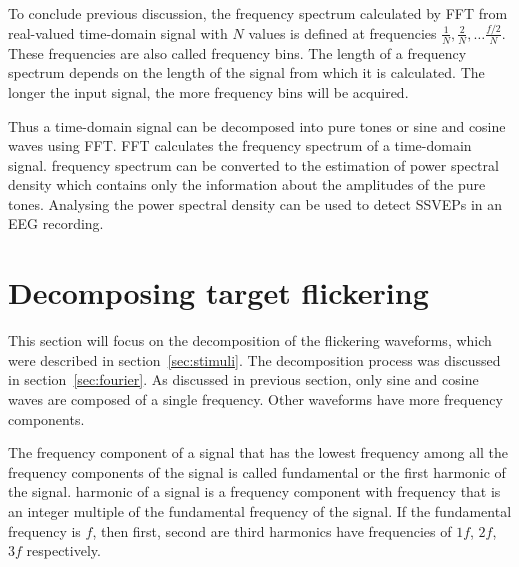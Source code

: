 To conclude previous discussion, the \gls{frequency spectrum} calculated by \gls{FFT} from real-valued time-domain signal with $N$ values is defined at frequencies $\frac{1}{N}, \frac{2}{N}, \dots\frac{f/2}{N}$. These frequencies are also called \glspl{frequency bin}. The length of a \gls{frequency spectrum} depends on the length of the signal from which it is calculated. The longer the input signal, the more \glspl{frequency bin} will be acquired.

Thus a time-domain signal can be decomposed into \glspl{pure tone} or sine and cosine waves using \gls{FFT}. \gls{FFT} calculates the \gls{frequency spectrum} of a time-domain signal. \Gls{frequency spectrum} can be converted to the estimation of \gls{power spectral density} which contains only the information about the amplitudes of the \glspl{pure tone}. Analysing the \gls{power spectral density} can be used to detect \glspl{SSVEP} in an \gls{EEG} recording.



\section{Decomposing target flickering}
\label{sec:decomposition}

This section will focus on the decomposition of the \glspl{flickering waveform}, which were described in section~\ref{sec:stimuli}. The decomposition process was discussed in section~\ref{sec:fourier}. As discussed in previous section, only sine and cosine waves are composed of a single frequency. Other waveforms have more \glspl{frequency component}.

The \gls{frequency component} of a signal that has the lowest frequency among all the \glspl{frequency component} of the signal is called \gls{fundamental} or the first \gls{harmonic} of the signal. \Gls{harmonic} of a signal is a \gls{frequency component} with frequency that is an integer multiple of the \gls{fundamental} frequency of the signal. If the \gls{fundamental} frequency is $f$, then first, second are third \glspl{harmonic} have frequencies of $1f$, $2f$, $3f$ respectively.

